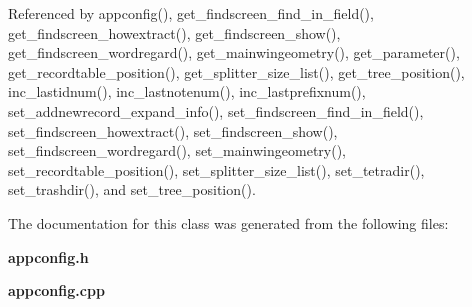 Referenced by appconfig(), get\_\-findscreen\_\-find\_\-in\_\-field(), get\_\-findscreen\_\-howextract(), get\_\-findscreen\_\-show(), get\_\-findscreen\_\-wordregard(), get\_\-mainwingeometry(), get\_\-parameter(), get\_\-recordtable\_\-position(), get\_\-splitter\_\-size\_\-list(), get\_\-tree\_\-position(), inc\_\-lastidnum(), inc\_\-lastnotenum(), inc\_\-lastprefixnum(), set\_\-addnewrecord\_\-expand\_\-info(), set\_\-findscreen\_\-find\_\-in\_\-field(), set\_\-findscreen\_\-howextract(), set\_\-findscreen\_\-show(), set\_\-findscreen\_\-wordregard(), set\_\-mainwingeometry(), set\_\-recordtable\_\-position(), set\_\-splitter\_\-size\_\-list(), set\_\-tetradir(), set\_\-trashdir(), and set\_\-tree\_\-position().

The documentation for this class was generated from the following files:\begin{CompactItemize}
\item 
{\bf appconfig.h}\item 
{\bf appconfig.cpp}\end{CompactItemize}
